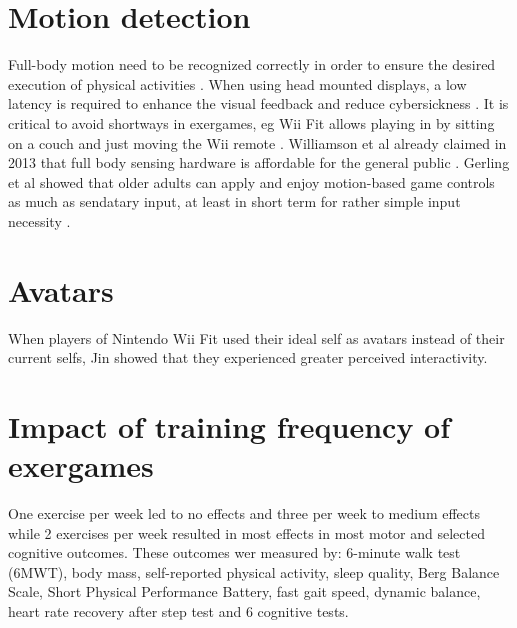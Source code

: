 \section{Motion detection}
Full-body motion need to be recognized correctly in order to ensure the desired execution of physical activities \cite{casermanfull}.
When using head mounted displays, a low latency is required to enhance the visual feedback and reduce cybersickness \cite{casermanfull}.
It is critical to avoid shortways in exergames, eg Wii Fit allows playing in by sitting on a couch and just moving the Wii remote \cite{laamarti2014overview}.
Williamson et al already claimed in 2013 that full body sensing hardware is affordable for the general public \cite{williamson2013full}.
Gerling et al showed that older adults can apply and enjoy motion-based game controls as much as sendatary input, at least in short term for rather simple input necessity \cite{gerling2013movement}.

\section{Avatars}
When players of Nintendo Wii Fit used their ideal self as avatars instead of their current selfs, Jin \cite{jin2009avatars} showed that they experienced greater perceived interactivity.


\section{Impact of training frequency of exergames}
One exercise per week led to no effects and three per week to medium effects while 2 exercises per week resulted in most effects  in most motor and selected cognitive outcomes. These outcomes wer measured by: 6-minute walk test (6MWT), body mass, self-reported physical activity, sleep quality, Berg Balance Scale, Short Physical Performance Battery, fast gait speed, dynamic balance, heart rate recovery after step test and 6 cognitive tests. \cite{hortobagyi2012effects}



